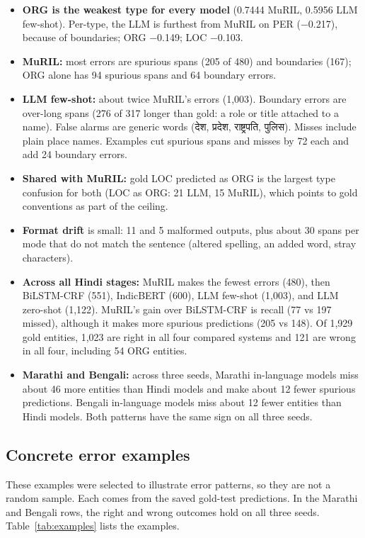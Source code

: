 \documentclass[10pt,twoside,a4paper]{article}
\newcommand{\dev}[1]{{\devfont #1}}
\begin{document}
\begin{itemize}
\item \textbf{ORG is the weakest type for every model} (0.7444 MuRIL, 0.5956 LLM few-shot). Per-type, the LLM is furthest from MuRIL on PER (−0.217), because of boundaries; ORG −0.149; LOC −0.103.
\item \textbf{MuRIL:} most errors are spurious spans (205 of 480) and boundaries (167); ORG alone has 94 spurious spans and 64 boundary errors.
\item \textbf{LLM few-shot:} about twice MuRIL's errors (1,003). Boundary errors are over-long spans (276 of 317 longer than gold: a role or title attached to a name). False alarms are generic words (\dev{देश}, \dev{प्रदेश}, \dev{राष्ट्रपति}, \dev{पुलिस}). Misses include plain place names. Examples cut spurious spans and misses by 72 each and add 24 boundary errors.
\item \textbf{Shared with MuRIL:} gold LOC predicted as ORG is the largest type confusion for both (LOC as ORG: 21 LLM, 15 MuRIL), which points to gold conventions as part of the ceiling.
\item \textbf{Format drift} is small: 11 and 5 malformed outputs, plus about 30 spans per mode that do not match the sentence (altered spelling, an added word, stray characters).
\item \textbf{Across all Hindi stages:} MuRIL makes the fewest errors (480), then BiLSTM-CRF (551), IndicBERT (600), LLM few-shot (1,003), and LLM zero-shot (1,122). MuRIL's gain over BiLSTM-CRF is recall (77 vs 197 missed), although it makes more spurious predictions (205 vs 148). Of 1,929 gold entities, 1,023 are right in all four compared systems and 121 are wrong in all four, including 54 ORG entities.
\item \textbf{Marathi and Bengali:} across three seeds, Marathi in-language models miss about 46 more entities than Hindi models and make about 12 fewer spurious predictions. Bengali in-language models miss about 12 fewer entities than Hindi models. Both patterns have the same sign on all three seeds.
\end{itemize}

\subsection{Concrete error examples}

These examples were selected to illustrate error patterns, so they are not a random sample. Each comes from the saved gold-test predictions. In the Marathi and Bengali rows, the right and wrong outcomes hold on all three seeds. Table~\ref{tab:examples} lists the examples.
\end{document}
